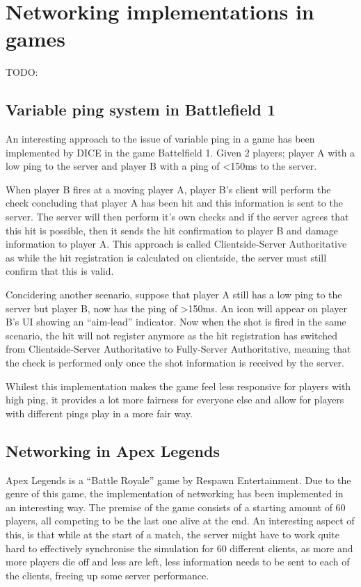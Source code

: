 \section{Networking implementations in games}
TODO:

\subsection{Variable ping system in Battlefield 1} \label{sec:bf1_ping}
An interesting approach to the issue of variable ping in a game has been implemented by DICE in the game Battelfield 1. Given 2 players; player A with a low ping to the server and player B with a ping of <150ms to the server.

When player B fires at a moving player A, player B's client will perform the check concluding that player A has been hit and this information is sent to the server. The server will then perform it's own checks and if the server agrees that this hit is possible, then it sends the hit confirmation to player B and damage information to player A. This approach is called Clientside-Server Authoritative as while the hit registration is calculated on clientside, the server must still confirm that this is valid.

Concidering another scenario, suppose that player A still has a low ping to the server but player B, now has the ping of >150ms. An icon will appear on player B's UI showing an ``aim-lead'' indicator. Now when the shot is fired in the same scenario, the hit will not register anymore as the hit registration has switched from Clientside-Server Authoritative to Fully-Server Authoritative, meaning that the check is performed only once the shot information is received by the server.

Whilest this implementation makes the game feel less responsive for players with high ping, it provides a lot more fairness for everyone else and allow for players with different pings play in a more fair way.


\subsection{Networking in Apex Legends}
Apex Legends is a ``Battle Royale'' game by Respawn Entertainment. Due to the genre of this game, the implementation of networking has been implemented in an interesting way. The premise of the game consists of a starting amount of 60 players, all competing to be the last one alive at the end. An interesting aspect of this, is that while at the start of a match, the server might have to work quite hard to effectively synchronise the simulation for 60 different clients, as more and more players die off and less are left, less information needs to be sent to each of the clients, freeing up some server performance.

